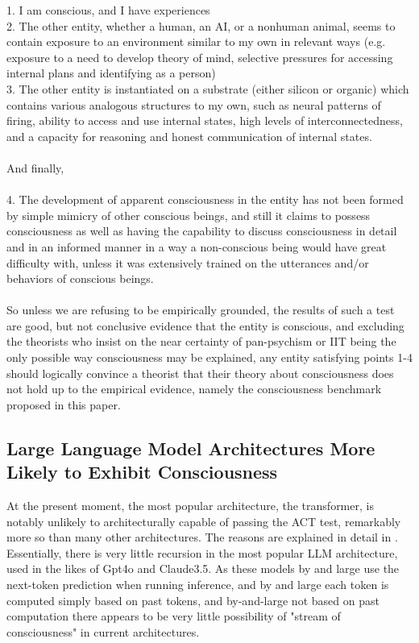 \documentclass{article}
\begin{document}
1. I am conscious, and I have experiences\\

2. The other entity, whether a human, an AI, or a nonhuman animal, seems to contain exposure to an environment similar to my own in relevant ways (e.g. exposure to a need to develop theory of mind, selective pressures for accessing internal plans and identifying as a person)\\

3. The other entity is instantiated on a substrate (either silicon or organic) which contains various analogous structures to my own, such as neural patterns of firing, ability to access and use internal states, high levels of interconnectedness, and a capacity for reasoning and honest communication of internal states.\\ \\
And finally,\\ \\
4. The development of apparent consciousness in the entity has not been formed by simple mimicry of other conscious beings, and still it claims to possess consciousness as well as having the capability to discuss consciousness in detail and in an informed manner in a way a non-conscious being would have great difficulty with, unless it was extensively trained on the utterances and/or behaviors of conscious beings.\\ \\ 
So unless we are refusing to be empirically grounded, the results of such a test are good, but not conclusive evidence that the entity is conscious, and excluding the theorists who insist on the near certainty of pan-psychism or IIT being the only possible way consciousness may be explained, any entity satisfying points 1-4 should logically convince a theorist that their theory about consciousness does not hold up to the empirical evidence, namely the consciousness benchmark proposed in this paper.
\subsection{Large Language Model Architectures More Likely to Exhibit Consciousness}
At the present moment, the most popular architecture, the transformer, is notably unlikely to architecturally capable of passing the ACT test, remarkably more so than many other architectures. The reasons are explained in detail in \citep{butlin2023consciousnessartificialintelligenceinsights}. Essentially, there is very little recursion in the most popular LLM architecture, used in the likes of Gpt4o and Claude3.5. As these models by and large use the next-token prediction when running inference, and by and large each token is computed simply based on past tokens, and by-and-large not based on past computation there appears to be very little possibility of "stream of consciousness" in current architectures.
\end{document}
